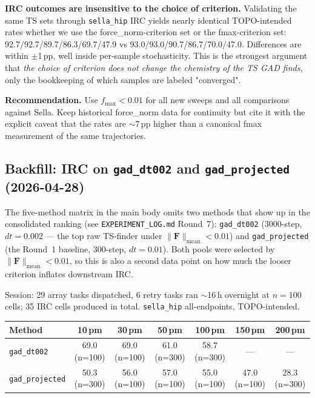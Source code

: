 \documentclass[11pt]{article}
\begin{document}
\textbf{IRC outcomes are insensitive to the choice of criterion.} Validating
the same TS sets through \texttt{sella\_hip} IRC yields nearly identical
TOPO-intended rates whether we use the force\_norm-criterion set or the
fmax-criterion set: 92.7/92.7/89.7/86.3/69.7/47.9 vs 93.0/93.0/90.7/86.7/70.0/47.0.
Differences are within $\pm$1\,pp, well inside per-sample stochasticity.
This is the strongest argument that \emph{the choice of criterion does not
change the chemistry of the TS GAD finds}, only the bookkeeping of which
samples are labeled "converged".

\textbf{Recommendation.} Use $f_{\max}{<}0.01$ for all new sweeps and
all comparisons against Sella. Keep historical force\_norm data for
continuity but cite it with the explicit caveat that the rates are
$\sim$7\,pp higher than a canonical fmax measurement of the same
trajectories.

\clearpage
\subsection{Backfill: IRC on \texttt{gad\_dt002} and \texttt{gad\_projected} (2026-04-28)}

The five-method matrix in the main body omits two methods that show up in
the consolidated ranking (see \texttt{EXPERIMENT\_LOG.md} Round~7):
\texttt{gad\_dt002} (3000-step,
$dt{=}0.002$ --- the top raw TS-finder under
$\|\mathbf{F}\|_{\text{mean}}{<}0.01$) and \texttt{gad\_projected} (the
Round~1 baseline, 300-step, $dt{=}0.01$). Both pools were selected by
$\|\mathbf{F}\|_{\text{mean}}{<}0.01$, so this is also a second data
point on how much the looser criterion inflates downstream IRC.

Session: 29 array tasks dispatched, 6 retry tasks ran $\sim$16\,h
overnight at $n{=}100$ cells; 35 IRC cells produced in total.
\texttt{sella\_hip} all-endpoints, TOPO-intended.

\begin{center}
\begin{tabular}{lcccccc}
\toprule
Method & 10\,pm & 30\,pm & 50\,pm & 100\,pm & 150\,pm & 200\,pm \\
\midrule
\texttt{gad\_dt002}     & 69.0 (n=100) & 69.0 (n=100) & 61.0 (n=300) & 58.7 (n=300) & --- & --- \\
\texttt{gad\_projected} & 50.3 (n=300) & 56.0 (n=100) & 57.0 (n=100) & 55.0 (n=100) & 47.0 (n=100) & 28.3 (n=300) \\
\bottomrule
\end{tabular}
\end{center}
\end{document}
